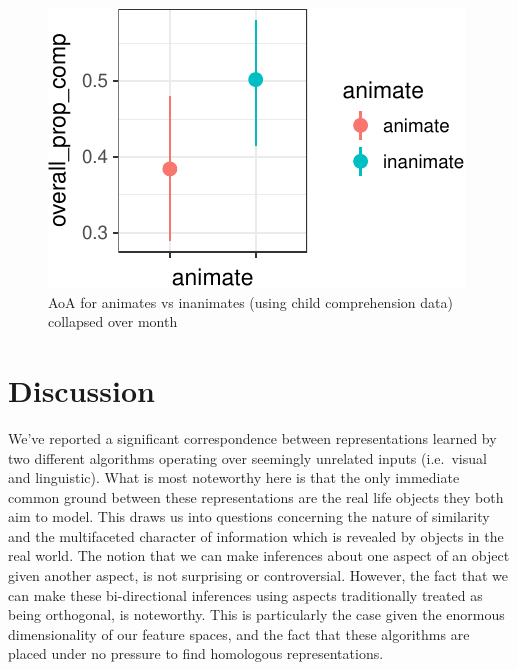 \documentclass[10pt, letterpaper]{article}
\newenvironment{CodeChunk}{}{}
\begin{document}
\begin{CodeChunk}
\begin{figure}[tb]
\includegraphics{figs/animacy-aoa-comp-graph-1} \caption[AoA for animates vs inanimates (using child comprehension data) collapsed over month]{AoA for animates vs inanimates (using child comprehension data) collapsed over month}\label{fig:animacy-aoa-comp-graph}
\end{figure}
\end{CodeChunk}

\section{Discussion}\label{discussion}

We've reported a significant correspondence between representations
learned by two different algorithms operating over seemingly unrelated
inputs (i.e.~visual and linguistic). What is most noteworthy here is
that the only immediate common ground between these representations are
the real life objects they both aim to model. This draws us into
questions concerning the nature of similarity and the multifaceted
character of information which is revealed by objects in the real world.
The notion that we can make inferences about one aspect of an object
given another aspect, is not surprising or controversial. However, the
fact that we can make these bi-directional inferences using aspects
traditionally treated as being orthogonal, is noteworthy. This is
particularly the case given the enormous dimensionality of our feature
spaces, and the fact that these algorithms are placed under no pressure
to find homologous representations.
\end{document}

